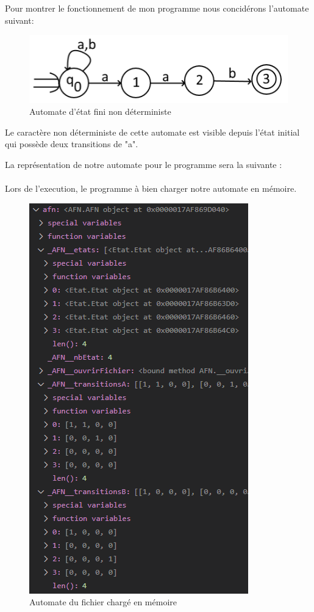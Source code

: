 \documentclass[a4paper]{article}
\begin{document}
	Pour montrer le fonctionnement de mon programme nous concidérons l'automate suivant:

\begin{figure}[!h]
	\centering
	\includegraphics[scale=0.4]{src/auto2.png}
	\caption{Automate d'état fini non déterministe}
\end{figure}

Le caractère non déterministe de cette automate est visible depuis l'état initial qui possède
deux transitions de "a".

La représentation de notre automate pour le programme sera la suivante :\\

\fbox{
	
}\\

Lors de l'execution, le programme à bien charger notre automate en mémoire.
\begin{figure}[!h]
	\centering
	\includegraphics[scale=0.8]{src/AfnCharge.PNG}
	\caption{Automate du fichier chargé en mémoire}
\end{figure}
\newpage
\end{document}
